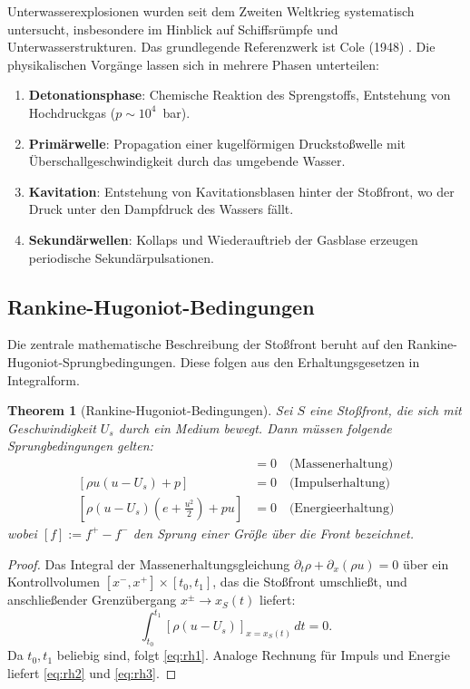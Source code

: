 ﻿\documentclass[12pt,a4paper]{article}
\newtheorem{theorem}{Theorem}[section]
\theoremstyle{definition}
\theoremstyle{remark}
\begin{document}
Unterwasserexplosionen wurden seit dem Zweiten Weltkrieg systematisch untersucht, insbesondere im Hinblick auf Schiffsrümpfe und Unterwasserstrukturen. Das grundlegende Referenzwerk ist Cole (1948) \cite{cole1948}. Die physikalischen Vorgänge lassen sich in mehrere Phasen unterteilen:

\begin{enumerate}[label=\textbf{\arabic*.}]
\item \textbf{Detonationsphase}: Chemische Reaktion des Sprengstoffs, Entstehung von Hochdruckgas ($p \sim 10^4$~bar).
\item \textbf{Primärwelle}: Propagation einer kugelförmigen Druckstoßwelle mit Überschall\-ge\-schwindigkeit durch das umgebende Wasser.
\item \textbf{Kavitation}: Entstehung von Kavitationsblasen hinter der Stoßfront, wo der Druck unter den Dampfdruck des Wassers fällt.
\item \textbf{Sekundärwellen}: Kollaps und Wiederauftrieb der Gasblase erzeugen periodische Sekundärpulsationen.
\end{enumerate}

\subsection{Rankine-Hugoniot-Bedingungen}

Die zentrale mathematische Beschreibung der Stoßfront beruht auf den Rankine-Hugoniot-Sprungbedingungen. Diese folgen aus den Erhaltungsgesetzen in Integralform.

\begin{theorem}[Rankine-Hugoniot-Bedingungen]
\label{thm:rankine}
Sei $S$ eine Stoßfront, die sich mit Geschwindigkeit $U_s$ durch ein Medium bewegt. Dann müssen folgende Sprungbedingungen gelten:
\begin{align}
[\rho(u - U_s)] &= 0 \quad \text{(Massenerhaltung)}\label{eq:rh1}\\
[\rho u(u - U_s) + p] &= 0 \quad \text{(Impulserhaltung)}\label{eq:rh2}\\
\left[\rho(u-U_s)\left(e + \frac{u^2}{2}\right) + pu\right] &= 0 \quad \text{(Energieerhaltung)}\label{eq:rh3}
\end{align}
wobei $[f] := f^+ - f^-$ den Sprung einer Größe über die Front bezeichnet.
\end{theorem}
\begin{proof}
Das Integral der Massenerhaltungsgleichung $\partial_t \rho + \partial_x(\rho u) = 0$ über ein Kontrollvolumen $[x^-,x^+] \times [t_0, t_1]$, das die Stoßfront umschließt, und anschließender Grenzübergang $x^\pm \to x_S(t)$ liefert:
\[
\int_{t_0}^{t_1} \left[\rho(u - U_s)\right]_{x=x_S(t)}\,dt = 0.
\]
Da $t_0, t_1$ beliebig sind, folgt \eqref{eq:rh1}. Analoge Rechnung für Impuls und Energie liefert \eqref{eq:rh2} und \eqref{eq:rh3}. 
\end{proof}
\end{document}
